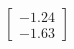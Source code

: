 \documentclass[preview]{standalone}
\begin{document}
\begin{align*}
\begin{bmatrix} -1.24 \\ -1.63 \end{bmatrix}
\end{align*}
\end{document}
